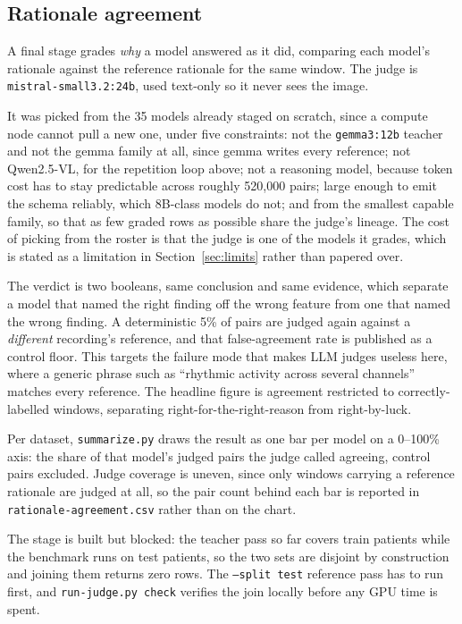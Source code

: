 \documentclass[11pt,a4paper]{article}
\newcommand{\file}[1]{{\small\texttt{#1}}}
\begin{document}
\subsection{Rationale agreement}

A final stage grades \emph{why} a model answered as it did, comparing each
model's rationale against the reference rationale for the same window. The judge
is \texttt{mistral-small3.2:24b}, used text-only so it never sees the image.

It was picked from the 35 models already staged on scratch, since a compute node
cannot pull a new one, under five constraints: not the \texttt{gemma3:12b}
teacher and not the gemma family at all, since gemma writes every reference; not
Qwen2.5-VL, for the repetition loop above; not a reasoning model, because token
cost has to stay predictable across roughly 520{,}000 pairs; large enough to emit
the schema reliably, which 8B-class models do not; and from the smallest capable
family, so that as few graded rows as possible share the judge's lineage. The
cost of picking from the roster is that the judge is one of the models it grades,
which is stated as a limitation in Section~\ref{sec:limits} rather than papered
over.

The verdict is two booleans, same conclusion and same evidence, which separate a
model that named the right finding off the wrong feature from one that named the
wrong finding. A deterministic 5\% of pairs are judged again against a
\emph{different} recording's reference, and that false-agreement rate is
published as a control floor. This targets the failure mode that makes LLM judges
useless here, where a generic phrase such as ``rhythmic activity across several
channels'' matches every reference. The headline figure is agreement restricted
to correctly-labelled windows, separating right-for-the-right-reason from
right-by-luck.

Per dataset, \file{summarize.py} draws the result as one bar per model on a
0--100\% axis: the share of that model's judged pairs the judge called agreeing,
control pairs excluded. Judge coverage is uneven, since only windows carrying a
reference rationale are judged at all, so the pair count behind each bar is
reported in \file{rationale-agreement.csv} rather than on the chart.

The stage is built but blocked: the teacher pass so far covers train patients
while the benchmark runs on test patients, so the two sets are disjoint by
construction and joining them returns zero rows. The \texttt{--split test}
reference pass has to run first, and \file{run-judge.py check} verifies the join
locally before any GPU time is spent.
\end{document}
